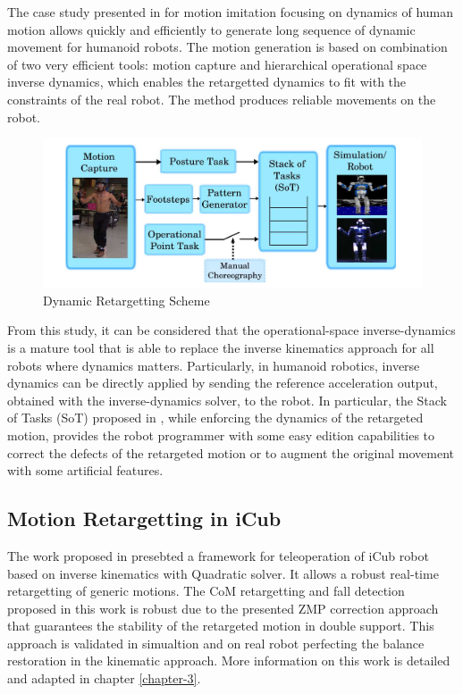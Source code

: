 The case study presented in \cite{ramosponce} for motion imitation focusing on dynamics of human motion allows quickly and 
efficiently to generate long sequence of dynamic movement for humanoid robots. The motion generation is based on combination 
of two very efficient tools: motion capture and hierarchical operational space inverse dynamics, which enables the retargetted 
dynamics to fit with the constraints of the real robot. The method produces reliable movements on the robot. 

\begin{figure}[h!]
    \centering
    \includegraphics[scale=0.25]{images/mansard's-work.png}\hfill
    \caption{Dynamic Retargetting Scheme \cite{ramosponce}}\hfill
    \label{fig: mansard's work}
\end{figure}

From this study, it can be considered that the operational-space inverse-dynamics is a mature tool that is able to replace 
the inverse kinematics approach for all robots where dynamics matters. Particularly, in humanoid robotics, inverse dynamics 
can be directly applied by sending the reference acceleration output, obtained with the inverse-dynamics solver, to the robot. 
In particular, the Stack of Tasks (SoT) proposed in \cite{ramosponce}, while enforcing the dynamics of the retargeted motion, 
provides the robot programmer with some easy edition capabilities to correct the defects of the retargeted motion or to augment
the original movement with some artificial features.

\subsection{Motion Retargetting in iCub}

The work proposed in \cite{gucci:hal-01895145} presebted a framework for teleoperation of iCub robot based on inverse kinematics 
with Quadratic solver. It allows a robust real-time retargetting of generic motions. The CoM retargetting and fall detection proposed
in this work is robust due to the presented ZMP correction approach that guarantees the stability of the retargeted motion in double support.
This approach is validated in simualtion and on real robot perfecting the balance restoration in the kinematic approach. More information
on this work is detailed and adapted in chapter \ref{chapter-3}.

